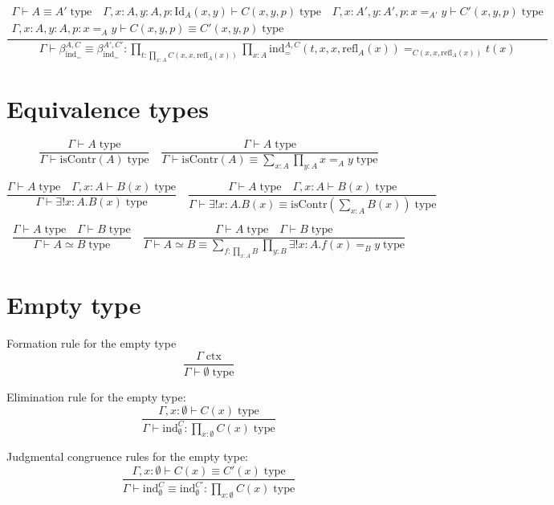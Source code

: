 \documentclass{book}
\begin{document}
$$\frac{
\begin{array}{c}
	\Gamma \vdash A \equiv A' \; \mathrm{type} \quad \Gamma, x:A, y:A, p:\mathrm{Id}_A(x, y) \vdash C(x, y, p) \; \mathrm{type} \quad \Gamma, x:A', y:A', p:x =_{A'} y \vdash C'(x, y, p) \; \mathrm{type} \\
	\Gamma, x:A, y:A, p:x =_A y \vdash C(x, y, p) \equiv C'(x, y, p) \; \mathrm{type}
\end{array}
}{\Gamma \vdash \beta_{ \mathrm{ind}_=}^{A, C} \equiv \beta_{\mathrm{ind}_=}^{A', C'}:\prod_{t:\prod_{x:A} C(x, x, \mathrm{refl}_A(x))} \prod_{x:A} \mathrm{ind}_{=}^{A, C}(t, x, x, \mathrm{refl}_A(x)) =_{C(x, x, \mathrm{refl}_A(x))} t(x)}$$

\section{Equivalence types}

$$\frac{\Gamma \vdash A \; \mathrm{type}}{\Gamma \vdash \mathrm{isContr}(A) \; \mathrm{type}} \quad \frac{\Gamma \vdash A \; \mathrm{type}}{\Gamma \vdash \mathrm{isContr}(A) \equiv \sum_{x:A} \prod_{y:A} x =_A y \; \mathrm{type}}$$

$$\frac{\Gamma \vdash A \; \mathrm{type} \quad \Gamma, x:A \vdash B(x) \; \mathrm{type}}{\Gamma \vdash \exists!x:A.B(x) \; \mathrm{type}} \quad \frac{\Gamma \vdash A \; \mathrm{type} \quad \Gamma, x:A \vdash B(x) \; \mathrm{type}}{\Gamma \vdash \exists!x:A.B(x) \equiv \mathrm{isContr}\left(\sum_{x:A} B(x)\right) \; \mathrm{type}}$$

$$\frac{\Gamma \vdash A \; \mathrm{type} \quad \Gamma \vdash B \; \mathrm{type}}{\Gamma \vdash A \simeq B \; \mathrm{type}} \quad \frac{\Gamma \vdash A \; \mathrm{type} \quad \Gamma \vdash B \; \mathrm{type}}{\Gamma \vdash A \simeq B \equiv \sum_{f:\prod_{x:A} B} \prod_{y:B} \exists!x:A.f(x) =_B y \; \mathrm{type}}$$

\section{Empty type}

Formation rule for the empty type
$$\frac{\Gamma \; \mathrm{ctx}}{\Gamma \vdash \emptyset \; \mathrm{type}}$$

Elimination rule for the empty type:
$$\frac{\Gamma, x:\emptyset \vdash C(x) \; \mathrm{type}}{\Gamma \vdash \mathrm{ind}_\emptyset^C:\prod_{x:\emptyset} C(x) \; \mathrm{type}}$$

Judgmental congruence rules for the empty type:
$$\frac{\Gamma, x:\emptyset \vdash C(x) \equiv C'(x) \; \mathrm{type}}{\Gamma \vdash \mathrm{ind}_\emptyset^C \equiv \mathrm{ind}_\emptyset^{C'}:\prod_{x:\emptyset} C(x) \; \mathrm{type}}$$
\end{document}
